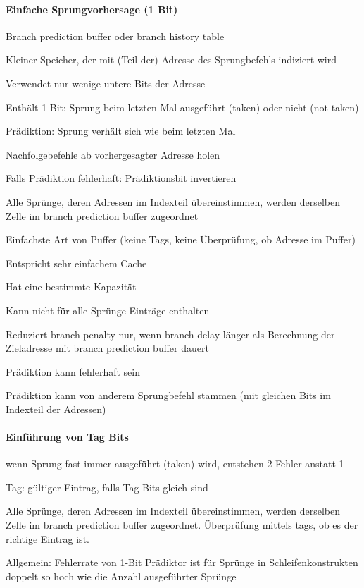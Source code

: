 \documentclass[10pt,landscape]{article}
\begin{document}
\begin{multicols}{3}
  \paragraph{ Einfache Sprungvorhersage (1 Bit)}
  \begin{itemize*}
    \item Branch prediction buffer oder branch history table
    \item Kleiner Speicher, der mit (Teil der) Adresse des Sprungbefehls indiziert wird
    \item Verwendet nur wenige untere Bits der Adresse
    \item Enthält 1 Bit: Sprung beim letzten Mal ausgeführt (taken) oder nicht (not taken)
    \item Prädiktion: Sprung verhält sich wie beim letzten Mal
    \item Nachfolgebefehle ab vorhergesagter Adresse holen
    \item Falls Prädiktion fehlerhaft: Prädiktionsbit invertieren
    \item Alle Sprünge, deren Adressen im Indexteil übereinstimmen, werden derselben Zelle im branch prediction buffer zugeordnet
    \item Einfachste Art von Puffer (keine Tags, keine Überprüfung, ob Adresse im Puffer)
    \item Entspricht sehr einfachem Cache
    \item Hat eine bestimmte Kapazität
    \item Kann nicht für alle Sprünge Einträge enthalten
    \item Reduziert branch penalty nur, wenn branch delay länger als Berechnung der Zieladresse mit branch prediction buffer dauert
    \item Prädiktion kann fehlerhaft sein
    \item Prädiktion kann von anderem Sprungbefehl stammen (mit gleichen Bits im Indexteil der Adressen)
  \end{itemize*}
  
  \paragraph{ Einführung von Tag Bits}
  \begin{itemize*}
    \item wenn Sprung fast immer ausgeführt (taken) wird, entstehen 2 Fehler anstatt 1
    \item Tag: gültiger Eintrag, falls Tag-Bits gleich sind
    \item Alle Sprünge, deren Adressen im Indexteil übereinstimmen, werden derselben Zelle im branch prediction buffer zugeordnet. Überprüfung mittels tags, ob es der richtige Eintrag ist.
    \item Allgemein: Fehlerrate von 1-Bit Prädiktor ist für Sprünge in Schleifenkonstrukten doppelt so hoch wie die Anzahl ausgeführter Sprünge
  \end{itemize*}
  

\end{multicols}
\end{document}
